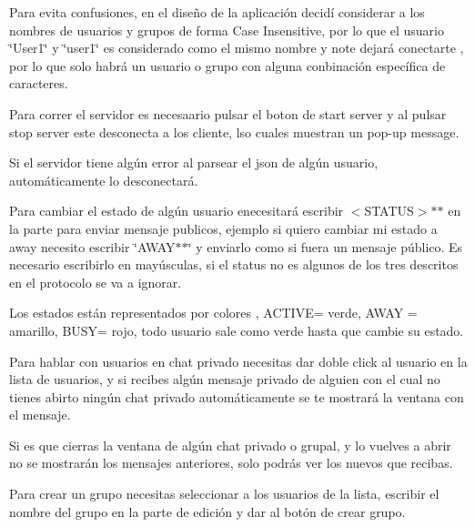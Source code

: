 Para evita confusiones, en el diseño de la aplicación decidí considerar a los nombres de usuarios y grupos de forma Case Insensitive, por lo que el usuario \char`\"{}\+User1\char`\"{} y \char`\"{}user1\char`\"{} es considerado como el mismo nombre y note dejará conectarte , por lo que solo habrá un usuario o grupo con alguna conbinación específica de caracteres.

Para correr el servidor es necesaario pulsar el boton de start server y al pulsar stop server este desconecta a los cliente, lso cuales muestran un pop-\/up message.

Si el servidor tiene algún error al parsear el json de algún usuario, automáticamente lo desconectará.

Para cambiar el estado de algún usuario enecesitará escribir $<$\+STATUS$>$$\ast$$\ast$ en la parte para enviar mensaje publicos, ejemplo si quiero cambiar mi estado a away necesito escribir \char`\"{}\+AWAY$\ast$$\ast$\char`\"{} y enviarlo como si fuera un mensaje público. Es necesario escribirlo en mayúsculas, si el status no es algunos de los tres descritos en el protocolo se va a ignorar.

Los estados están representados por colores , ACTIVE= verde, AWAY = amarillo, BUSY= rojo, todo usuario sale como verde hasta que cambie su estado.

Para hablar con usuarios en chat privado necesitas dar doble click al usuario en la lista de usuarios, y si recibes algún mensaje privado de alguien con el cual no tienes abirto ningún chat privado automáticamente se te mostrará la ventana con el mensaje.

Si es que cierras la ventana de algún chat privado o grupal, y lo vuelves a abrir no se mostrarán los mensajes anteriores, solo podrás ver los nuevos que recibas.

Para crear un grupo necesitas seleccionar a los usuarios de la lista, escribir el nombre del grupo en la parte de edición y dar al botón de crear grupo. 